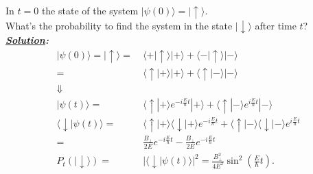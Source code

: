 \documentclass[notitlepage]{report}
\begin{document}
\begin{question}[title = Question 6]{}{}
\begin{question}[title = Part 6]{}{}
In $t=0$ the state of the system $|\psi\left(0\right) \rangle=|\uparrow\rangle  $.\\
What's the probability to find the system in the state $|\downarrow\rangle$ after time $t$?
\tcblower
\textbf{\emph{\underline{Solution}:}}\\
\begin{align*}
	|\psi\left(0\right) \rangle=|\uparrow\rangle =&\ \langle+|\uparrow\rangle|+\rangle+\langle-|\uparrow\rangle|-\rangle  \\
	=&\ \langle\uparrow|+\rangle|+\rangle+\langle\uparrow|-\rangle|-\rangle  \\
	\Downarrow&\\
	|\psi\left(t\right) \rangle =&\ \langle\uparrow|+\rangle e^{-i \frac{E}{\hslash}t}|+\rangle+\langle\uparrow|-\rangle e^{i \frac{E}{\hslash}t}|-\rangle \\
	\langle\downarrow|\psi\left(t\right) \rangle =&\ \langle\uparrow|+\rangle \langle\downarrow|+\rangle e^{-i \frac{E}{\hslash}t}+\langle\uparrow|-\rangle \langle\downarrow|-\rangle e^{i \frac{E}{\hslash}t} \\
	 =&\ \frac{B_\perp}{2E}e^{-i \frac{E}{\hslash}t}- \frac{B_\perp}{2E}e^{-i \frac{E}{\hslash}t}\\
	 P_t\left(|\downarrow\rangle \right) =&\ |\langle\downarrow|\psi\left(t\right) \rangle|^2 = \boxed{\frac{B^2_\perp}{4E^2}\sin^2\left(\frac{E}{\hslash}t\right)} 
.\end{align*}
\end{question}
\end{question}
\end{document}
